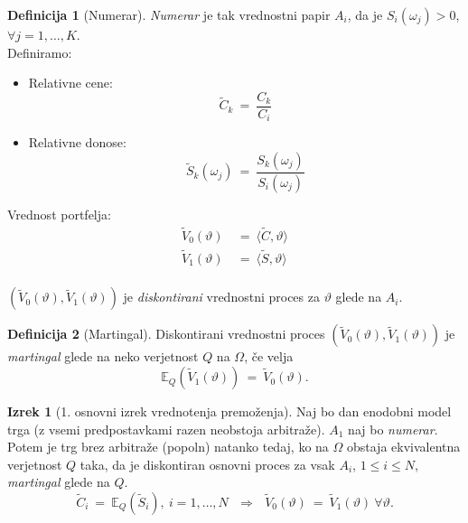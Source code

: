 \documentclass[11pt]{article}
\newcommand{\E}{\mathbb{E}}
\theoremstyle{definition}
\newtheorem{definicija}{Definicija}[section]
\theoremstyle{definition}
\newtheorem{izrek}{Izrek}[section]
\begin{document}
\begin{definicija}[Numerar]

\textit{Numerar} je tak vrednostni papir $A_i$, da je $S_i(\omega_j) > 0$, $\forall j = 1,\ldots, K$. \\

\noindent Definiramo:
\begin{itemize}
	
	\item Relativne cene:
	$$\tilde{C}_k ~=~ \frac{C_k}{C_i}$$
	
	\item Relativne donose:
	$$\tilde{S}_k(\omega_j) ~=~ \frac{S_k(\omega_j)}{S_i(\omega_j)}$$
	
\end{itemize} 

\noindent Vrednost portfelja:
\begin{align*}
\tilde{V}_0(\vartheta) ~&=~ \langle \tilde{C}, \vartheta \rangle \\
\tilde{V}_1(\vartheta) ~&=~ \langle \tilde{S}, \vartheta \rangle
\end{align*} \\

\noindent $(\tilde{V}_0(\vartheta), \tilde{V}_1(\vartheta))$ je \textit{diskontirani} vrednostni proces za $\vartheta$ glede na $A_i$.


\end{definicija}
\vspace{0.5cm}

\begin{definicija}[Martingal]

Diskontirani vrednostni proces $(\tilde{V}_0(\vartheta), \tilde{V}_1(\vartheta))$ je \textit{martingal} glede na neko verjetnost $Q$ na $\Omega$, če velja
$$\E_Q(\tilde{V}_1(\vartheta)) ~=~ \tilde{V}_0(\vartheta).$$

\end{definicija}
\vspace{0.5cm}

\begin{izrek}[1. osnovni izrek vrednotenja premoženja]

Naj bo dan enodobni model trga (z vsemi predpostavkami razen neobstoja arbitraže). $A_1$ naj bo \textit{numerar}. Potem je trg brez arbitraže (popoln) natanko tedaj, ko na $\Omega$ obstaja ekvivalentna verjetnost $Q$ taka, da je diskontiran osnovni proces za vsak $A_i$, $1 \leq i \leq N$, \textit{martingal} glede na $Q$.
$$\tilde{C}_i ~=~ \E_Q(\tilde{S}_i), ~i = 1,\ldots, N ~~~\Longrightarrow~~~ \tilde{V}_0(\vartheta) ~=~ \tilde{V}_1(\vartheta) ~\forall \vartheta.$$

\end{izrek}
\vspace{0.5cm}
\end{document}
